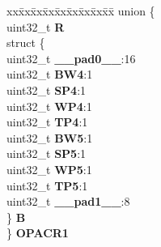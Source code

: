 \begin{DoxyCompactItemize}
\begin{tabbing}
\end{tabbing}\item 
\mbox{\label{structPBRIDGE__B__tag_ae1c84d438d4d37ea669b4682454d1b1b}} 
\begin{tabbing}
xx\=xx\=xx\=xx\=xx\=xx\=xx\=xx\=xx\=\kill
union \{\\
\>uint32\_t {\bfseries R}\\
\>struct \{\\
\>\>uint32\_t {\bfseries \_\_pad0\_\_}:16\\
\>\>uint32\_t {\bfseries BW4}:1\\
\>\>uint32\_t {\bfseries SP4}:1\\
\>\>uint32\_t {\bfseries WP4}:1\\
\>\>uint32\_t {\bfseries TP4}:1\\
\>\>uint32\_t {\bfseries BW5}:1\\
\>\>uint32\_t {\bfseries SP5}:1\\
\>\>uint32\_t {\bfseries WP5}:1\\
\>\>uint32\_t {\bfseries TP5}:1\\
\>\>uint32\_t {\bfseries \_\_pad1\_\_}:8\\
\>\} {\bfseries B}\\
\} {\bfseries OPACR1}\\


\end{tabbing}
\end{DoxyCompactItemize}
